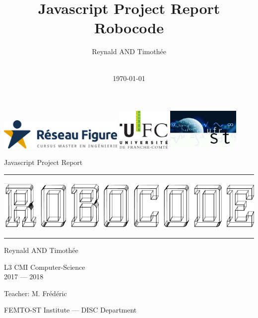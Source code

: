 \documentclass[a4paper, 10pt, oneside]{article}
\title{Javascript Project Report\\Robocode}
\author{Reynald \bsc{Barbeaut} AND Timothée \bsc{Guy}}
\date{\\\today}
\begin{document}
\begin{titlepage}

	\centering
	\includegraphics[height=1.5cm]{img/logo_figure.png}
	\hspace{1cm}
	\includegraphics[height=2cm]{img/logo_ufc.png}
	\hspace{1cm}
	\includegraphics[height=2cm]{img/logo_ufr_st.png}

	\vspace{3cm}

	{\LARGE Javascript Project Report\par}
	\vspace{2cm}
	\rule{\linewidth}{.8pt}\par
	\vspace{0.8cm}
	\includegraphics[height=2.5cm]{img/logo_robocode.png}
	\vspace{0.8cm}
	\rule{\linewidth}{.8pt}

	\vspace{2cm}
	{\LARGE Reynald  AND Timothée \\}
	\vspace{2cm}
	{\Large L3 CMI Computer-Science\\2017 --- 2018\par}
	\vspace{1cm}
	{\large Teacher: M. Frédéric \par}
	{\large FEMTO-ST Institute --- DISC Department\par}

\end{titlepage}
\end{document}
